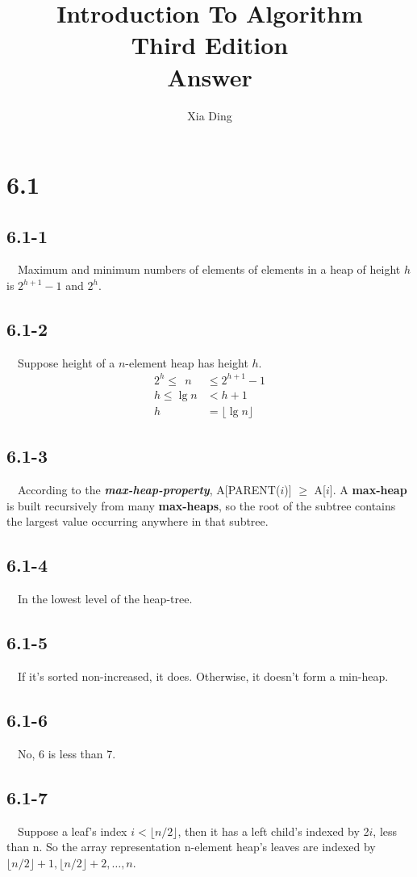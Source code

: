 \documentclass{article}
\author{Xia Ding}
\title{\textbf{Introduction To Algorithm}\\Third Edition\\\textbf{Answer}}
\begin{document}
\maketitle
\section*{6.1}
\subsection*{6.1-1}
~~Maximum and minimum numbers of elements of elements in a heap of
height $h$ is $2^{h\!+\!1}-1$ and $2^h$.

\subsection*{6.1-2}
~~Suppose height of a $n$-element heap has height $h$.\\
\begin{align*}
2^h \le~~ n ~&\le 2^{h\!+\!1}-1\\
h \le \lg n &< h + 1\\
 h &= \lfloor {\lg n} \rfloor
\end{align*}


\subsection*{6.1-3}
~~According to the \textbf \textit {max-heap-property},
A[PARENT($i$)] $\ge$ A[$i$]. A \textbf{max-heap} is built
recursively from many \textbf{max-heaps}, so the root of the subtree
contains the largest value occurring anywhere in that subtree.

\subsection*{6.1-4}
~~In the lowest level of the heap-tree.

\subsection*{6.1-5}
~~If it's sorted non-increased, it does. Otherwise, it doesn't form
a min-heap.

\subsection*{6.1-6}
~~No, 6 is less than 7.

\subsection*{6.1-7}
~~Suppose a leaf's index $i < \lfloor {n/2} \rfloor$, then it has a
left child's indexed by 2$i$, less than n. So the array
representation n-element heap's leaves are indexed by
$\lfloor {n/2} \rfloor + 1, \lfloor {n/2} \rfloor +2,\ldots{}, n$.
\end{document}
